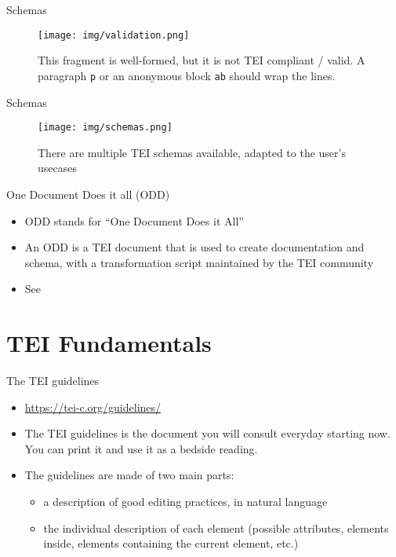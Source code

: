 \documentclass[11pt,aspectratio=1610]{beamer}
\begin{document}
\begin{frame}{Schemas}
\begin{center}
\begin{figure}
\texttt{[image: img/validation.png]}
\caption{This fragment is well-formed, but it is not TEI compliant / valid. A paragraph \texttt{p} or an anonymous block \texttt{ab} should wrap the lines.}
\end{figure}
\end{center}
\end{frame}


\begin{frame}{Schemas}
\begin{center}
\begin{figure}
\texttt{[image: img/schemas.png]}
\caption{There are multiple TEI schemas available, adapted to the user's usecases}
\end{figure}
\end{center}
\end{frame}


\begin{frame}{One Document Does it all (ODD)}
\begin{itemize}
\item ODD stands for \enquote{One Document Does it All}
\item An ODD is a TEI document that is used to create documentation and schema, with a transformation script maintained by the TEI community
\item See \cite{burnard_WhatTEIConformance_2019}
\end{itemize}
\end{frame}





\section{TEI Fundamentals}

\begin{frame}{The TEI guidelines}
\begin{itemize}
\item \url{https://tei-c.org/guidelines/}
\item The TEI guidelines is the document you will consult everyday starting now. You can print it and use it as a bedside reading.
\item The guidelines are made of two main parts: 
\begin{itemize}
\item a description of good editing practices, in natural language
\item the individual description of each element (possible attributes, elements inside, elements containing the current element, etc.)
\end{itemize}
\end{itemize}
\end{frame}
\end{document}
